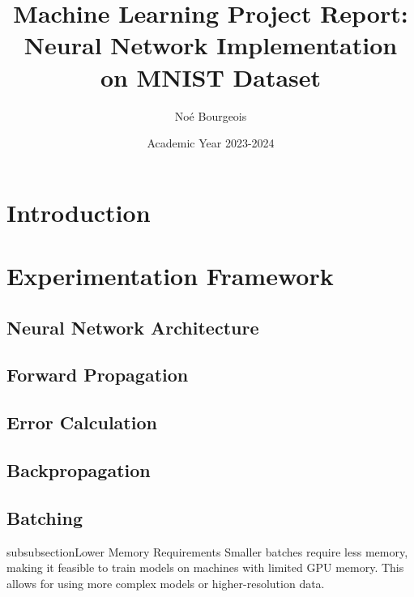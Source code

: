 \documentclass{article}
\title{Machine Learning Project Report: Neural Network Implementation on MNIST Dataset}
\author{Noé Bourgeois}
\date{Academic Year 2023-2024}
\begin{document}
\maketitle

\begin{abstract}
\end{abstract}

\section{Introduction}

\section{Experimentation Framework}

\subsection{Neural Network Architecture}

\subsection{Forward Propagation}

\subsection{Error Calculation}

\subsection{Backpropagation}

\subsection{Batching}
subsubsection{Lower Memory Requirements}
 Smaller batches require less memory, making it feasible to train models on machines with limited GPU memory. 
 This allows for using more complex models or higher-resolution data.
\end{document}

